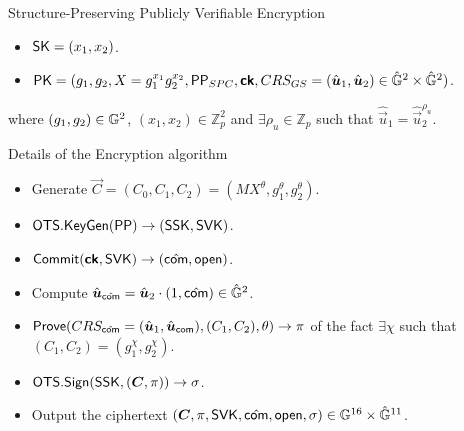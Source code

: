 \begin{frame}{Structure-Preserving Publicly Verifiable Encryption}
    \begin{itemize}
    \item $\mathsf{SK} = (x_1, x_2)$.
    \item $\mathsf{PK} = (g_1, g_2, X = g_1^{x_1}g_2^{x_2}, \mathsf{PP}_{SPC}, \boldsymbol{\mathsf{ck}}, CRS_{GS} = (\hat{\boldsymbol{u}}_1, \hat{\boldsymbol{u}}_2) \in \hat{\mathbb{G}}^2 \times \hat{\mathbb{G}}^2)$.
    \end{itemize}
    where $(g_1, g_2) \in \mathbb{G}^2$, $(x_1, x_2) \in \mathbb{Z}_p^2$ and $\exists \rho_u \in \mathbb{Z}_p$ such that $\hat{\vec{u}}_1 = \hat{\vec{u}}_2^{\rho_u}$.

  \begin{block}{Details of the Encryption algorithm}

    
    \begin{itemize}
    \item Generate $\vec{C} = (C_0, C_1, C_2) = (MX^{\theta}, g_1^{\theta},  g_2^{\theta})$.
    \item ${\mathsf{OTS}}.{\mathsf{KeyGen}}(\mathsf{PP}) \to (\mathsf{SSK}, \mathsf{SVK})$.
    \item ${\mathsf{Commit}}(\boldsymbol{\mathsf{ck}}, \mathsf{SVK}) \to (\hat{\mathsf{com}}, \mathsf{open})$.
    \item Compute $\hat{\boldsymbol{u}}_{\hat{\mathsf{com}}} = \hat{\boldsymbol{u}}_2 \cdot (1, \hat{\mathsf{com}}) \in \hat{\mathbb{G}}^2$.
    \item ${\mathsf{Prove}}(CRS_{\hat{\mathsf{com}}} = (\hat{\boldsymbol{u}}_1, \hat{\boldsymbol{u}}_{\mathsf{com}}), (C_1, C_2), \theta) \to \pi$ of the fact $\exists \chi$ such that $(C_1, C_2) = (g_1^\chi, g_2^\chi)$.
    \item ${\mathsf{OTS}}.{\mathsf{Sign}}(\mathsf{SSK},(\boldsymbol{C},\pi)) \to \sigma$.
    \item Output the ciphertext $(\boldsymbol{C}, \pi, \mathsf{SVK}, \hat{\mathsf{com}}, \mathsf{open}, \sigma) \in \mathbb{G}^{16} \times \hat{\mathbb{G}}^{11}$.
    \end{itemize}

  \end{block}
\end{frame}



